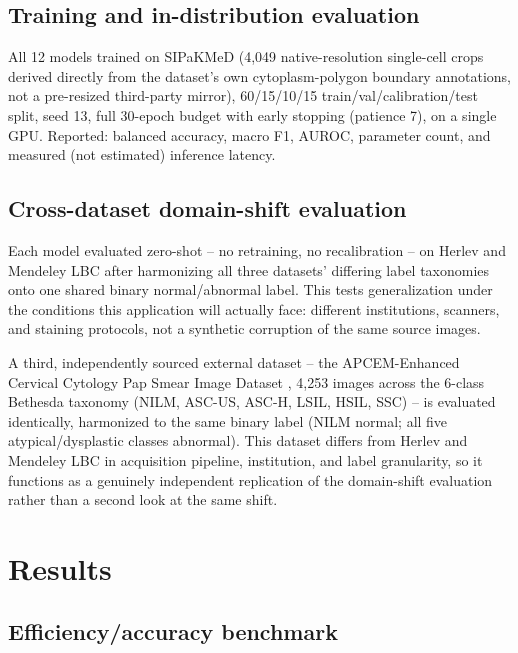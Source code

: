 \documentclass[runningheads]{llncs}
\begin{document}
\subsection{Training and in-distribution evaluation}

All 12 models trained on SIPaKMeD \cite{plissiti2018sipakmed}
(4,049 native-resolution single-cell crops derived directly from the
dataset's own cytoplasm-polygon boundary annotations, not a pre-resized
third-party mirror), 60/15/10/15 train/val/calibration/test split, seed 13,
full 30-epoch budget with early stopping (patience 7), on a single GPU.
Reported: balanced accuracy, macro F1, AUROC, parameter count, and
measured (not estimated) inference latency.

\subsection{Cross-dataset domain-shift evaluation}

Each model evaluated zero-shot -- no retraining, no recalibration -- on
Herlev \cite{jantzen2005herlev} and Mendeley LBC
\cite{hussain2020mendeley} after harmonizing all three datasets' differing
label taxonomies onto one shared binary normal/abnormal label. This tests
generalization under the conditions this application will actually face:
different institutions, scanners, and staining protocols, not a synthetic
corruption of the same source images.

A third, independently sourced external dataset -- the APCEM-Enhanced
Cervical Cytology Pap Smear Image Dataset \cite{aswini2026apcem}, 4,253
images across the 6-class Bethesda taxonomy (NILM, ASC-US, ASC-H, LSIL,
HSIL, SSC) -- is evaluated identically, harmonized to the same binary label
(NILM normal; all five atypical/dysplastic classes abnormal). This dataset
differs from Herlev and Mendeley LBC in acquisition pipeline, institution,
and label granularity, so it functions as a genuinely independent
replication of the domain-shift evaluation rather than a second look at
the same shift.

\section{Results}

\subsection{Efficiency/accuracy benchmark}
\end{document}
